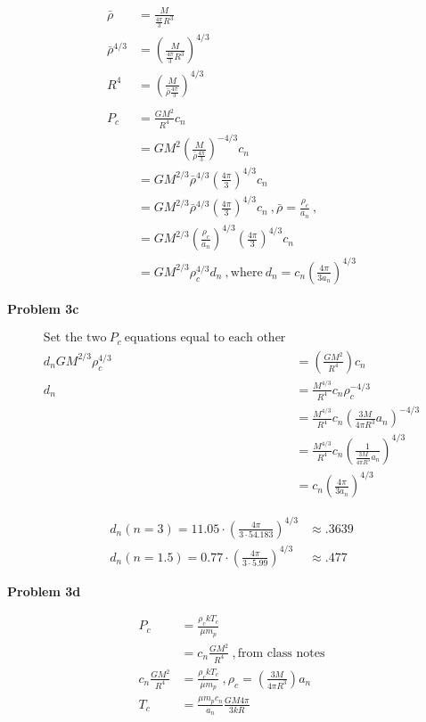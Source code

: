 \documentclass[10pt,a4paper]{article}
\begin{document}
\begin{align*}
\bar{\rho} &= \frac{M}{\frac{4 \pi}{3}R^3}\\
\bar{\rho}^{4/3} & = \left( \frac{M}{\frac{4 \pi}{3}R^3} \right)^{4/3}\\
R^4 & = \left( \frac{M}{\bar{\rho} \frac{4 \pi}{3}} \right)^{4/3}\\
\\
P_c & = \frac{GM^2}{R^4}c_n\\
& = GM^2{\left( \frac{M}{\bar{\rho} \frac{4 \pi}{3}} \right)^{-4/3}}c_n\\
& = GM^{2/3}\bar{\rho}^{4/3} \left( \frac{4 \pi}{3} \right)^{4/3} c_n\\
& = GM^{2/3}\bar{\rho}^{4/3} \left( \frac{4 \pi}{3} \right)^{4/3} c_n~, \bar{\rho} = \frac{\rho_c}{a_n}~,\\
& = GM^{2/3}\left(\frac{\rho_c}{a_n} \right)^{4/3} \left( \frac{4 \pi}{3} \right)^{4/3} c_n\\
& = GM^{2/3}\rho_c^{4/3}d_n~, \text{where}~ d_n = c_n \left( \frac{4 \pi}{3 a_n} \right)^{4/3}
\end{align*}

\large{\textbf{Problem 3c}}
\begin{flushleft}
\begin{align*}
\text{Set the two}~P_c ~\text{equations equal to each other}\\
d_n GM^{2/3}\rho_c^{4/3} & = \left( \frac{GM^2}{R^4} \right) c_n\\
d_n & = \frac{M^{4/3}}{R^4}c_n \rho_c^{-4/3}\\
& = \frac{M^{4/3}}{R^4}c_n \left( \frac{3M}{4 \pi R^3} a_n \right)^{-4/3}\\
& = \frac{M^{4/3}}{R^4}c_n \left(\frac{1}{\frac{3M}{4 \pi R^3}a_n} \right)^{4/3}\\
& = c_n \left(\frac{4 \pi}{3 a_n} \right)^{4/3}
\end{align*}
\end{flushleft}

\begin{align*}
d_n(n=3) = 11.05 \cdot \left(\frac{4 \pi}{3 \cdot 54.183} \right)^{4/3} &\approx .3639\\
d_n(n=1.5) = 0.77 \cdot \left(\frac{4 \pi}{3 \cdot 5.99} \right)^{4/3} &\approx .477
\end{align*}

\large{\textbf{Problem 3d}}

\begin{align*}
P_c & = \frac{\rho_c k T_c}{\mu m_p}\\
& = c_n \frac{GM^2}{R^4}~, \text{from class notes}\\
c_n \frac{GM^2}{R^4} & = \frac{\rho_c k T_c}{\mu m_p}~, \rho_c = \left( \frac{3M}{4 \pi R^3} \right) a_n\\
T_c & =\frac{\mu m_p c_n}{a_n} \frac{GM 4 \pi}{3kR}
\end{align*}
\end{document}
